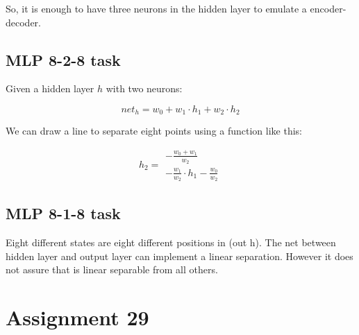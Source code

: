 \documentclass[12pt]{article}
\begin{document}
So, it is enough to have three neurons in the hidden layer to emulate a
encoder-decoder.

\subsection{MLP 8-2-8 task}

Given a hidden layer $h$ with two neurons:

$$ net_{h} = w_{0} + w_{1} \cdot h_{1} +  w_{2} \cdot h_{2} $$

We can draw a line to separate eight points using a function like this:

\begin{equation}
    h_{2} = \begin{array}{l}
                    - \frac{w_{0} + w_{1}}{w_{2}}\\
                    - \frac{w_{1}}{w_{2}} \cdot h_{1} - \frac{w_{0}}{w_{2}}
            \end{array}
\end{equation}

\bigskip
\bigskip

\subsection{MLP 8-1-8 task}

Eight different states are eight different positions in (out h). The net
between hidden layer and output layer can implement a linear separation.
However it does not assure that is linear separable from all others.

\section{Assignment 29}
\end{document}
